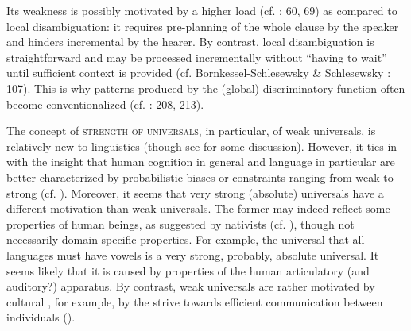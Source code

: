 \documentclass[output=paper]{langsci/langscibook}
\begin{document}
Its weakness is possibly motivated by a higher  load (cf. \citealt{Hawkins2014_CompMot}: 60, 69) as compared to local disambiguation: it requires pre-planning of the whole clause by the speaker and hinders incremental  by the hearer. By contrast, local disambiguation is straightforward and may be processed incrementally without “having to wait” until sufficient context is provided (cf.
Born\-kes\-sel-Schlesewsky \& Schlesewsky \citeyear*{Bornkessel-SchlesewskySchlesewsky2014}: 107). This is why patterns produced by the (global) discriminatory function often become conventionalized (cf. \citealt{Aissen2003,ZeevatJäger2002,Jäger2004,Malchukov2008}: 208, 213).

The concept of \textsc{strength of universals}, in particular, of weak universals, is relatively new to linguistics (though see \citealt{Bickel2013} for some discussion). However, it ties in with the insight that human cognition in general and language  in particular are better characterized by probabilistic biases or constraints ranging from weak to strong (cf. \citealt{ThompsonEtAl2016}). Moreover, it seems that very strong (absolute) universals have a different motivation than weak universals. The former may indeed reflect some  properties of human beings, as suggested by nativists (cf. \citealt{Chomsky1965}), though not necessarily domain-specific properties. For example, the universal that all languages must have vowels \citep[19]{Comrie1989} is a very strong, probably, absolute universal. It seems likely that it is caused by  properties of the human articulatory (and auditory?) apparatus. By contrast, weak universals are rather motivated by cultural , for example, by the strive towards efficient communication between individuals (). 
\end{document}
